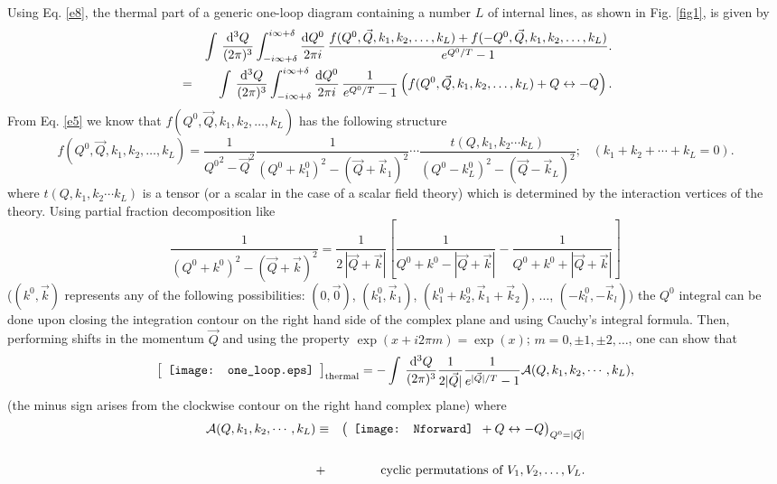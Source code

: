 \documentclass[longbibliography,groupedaddress,showpacs,showkeys,amssymb,eqsecnum,aps,nofootinbib,superscriptaddress]{revtex4}
\newcommand{\be}{\begin{equation}}
\newcommand{\ee}{\end{equation}}
\begin{document}
Using Eq. \eqref{e8}, the thermal part of a generic one-loop diagram containing a number $L$
of internal lines, as shown in Fig. \ref{fig1}, is given by
\begin{eqnarray}
&&\int\,\frac{{\rm d}^3 Q}{(2\pi)^3}\int_{-i\infty+\delta}^{i\infty+\delta}
\frac{{\rm d} Q^0}{2\pi i}\, 
\frac{f(Q^0,\vec Q, k_1,k_2,\dots, k_L)+f(-Q^0,\vec Q, k_1,k_2,\dots, k_L)}{e^{Q^0/T}-1}.
\nonumber \\ &=&
\int\,\frac{{\rm d}^3 Q}{(2\pi)^3}\int_{-i\infty+\delta}^{i\infty+\delta}
\frac{{\rm d} Q^0}{2\pi i}\, \frac{1}{e^{Q^0/T}-1}
\left(f(Q^0,\vec Q, k_1,k_2,\dots, k_L)+ Q\leftrightarrow - Q
\right).
\end{eqnarray}
From Eq. \eqref{e5} we know that $f(Q^0,\vec Q, k_1,k_2,\dots, k_L)$
has the following structure
\be
f(Q^0,\vec Q, k_1,k_2,\dots, k_L) =
\frac{1}{{Q^0}^2-\vec Q^2}\frac{1}{(Q^0+k_1^0)^2-(\vec Q+\vec k_1)^2}
\cdots
\frac{t(Q, k_1,k_2\cdots k_L)}{(Q^0-k_L^0)^2-(\vec Q-\vec k_L)^2};
\;\;\; (k_1+k_2+\cdots +k_L=0).
\ee
where $t(Q, k_1,k_2\cdots k_L)$ is a tensor (or a scalar in the case
of a scalar field theory) which is determined by the interaction
vertices of the theory.  Using partial fraction decomposition like
\be
\frac{1}{(Q^0+{k}^0)^2-(\vec Q+\vec k)^2} =
\frac{1}{2\,|\vec Q + \vec {k}|}\left[
\frac{1}{Q^0+ k^0 - |\vec Q + \vec {k}|} -
\frac{1}{Q^0+ k^0 + |\vec Q + \vec {k}|}
\right]
\ee
($(k^0,\vec k)$ 
represents any of the following possibilities: $(0,\vec 0)$, $(k^0_1,\vec k_1)$, $(k^0_1+k^0_2,\vec k_1+\vec k_2)$, $\dots$, $(-k^0_l,-\vec k_l)$)
the $Q^0$ integral can be done upon
closing the integration contour on 
the right hand side of the 
complex plane
and using Cauchy's integral formula.
Then, performing shifts in the momentum $\vec Q$ and using 
the property $\exp(x+i 2\pi m) =
\exp(x)$; $m=0,\pm 1, \pm 2, \dots$, one can show that
\be\label{barton1}
\left[
\begin{array}{l}
    \texttt{[image: one\_loop.eps]}
\end{array}\right]_{\rm thermal}
=  -\int\,\frac{{\rm d}^3 Q}{(2\pi)^3}
\frac{1}{2|\vec Q|}\frac{1}{e^{|\vec Q|/T}-1}
{\cal A}(Q,k_1,k_2,\cdots,k_L)
,
\ee 
(the minus sign arises from the clockwise contour on the right hand
complex plane)
where %
\begin{eqnarray}\label{genamp}
{\cal A}(Q,k_1,k_2,\cdots,k_L)&\equiv&
\left(
\begin{array}{c}
%
    \texttt{[image: Nforward]}
\end{array}
+ Q\leftrightarrow  - Q
\right)_{Q^0=|\vec Q|} 
\nonumber \\
&&\nonumber \\
&+& 
\mbox{ cyclic permutations of } V_1,V_2,\dots,V_L .
\end{eqnarray}
\end{document}
